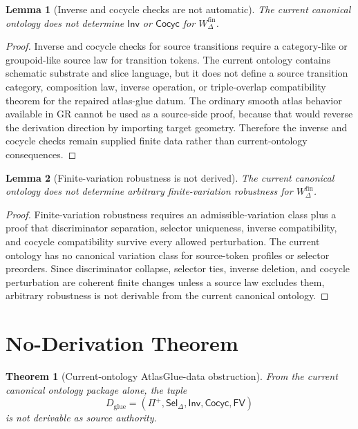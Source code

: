 \documentclass[11pt]{article}
\newcommand{\Prof}{\Pi^{+}}
\newcommand{\Sel}{\mathsf{Sel}_{\Delta}}
\newcommand{\Wfin}{W_{\Delta}^{\mathrm{fin}}}
\newtheorem{lemma}{Lemma}
\newtheorem{theorem}{Theorem}
\begin{document}
\begin{lemma}[Inverse and cocycle checks are not automatic]
The current canonical ontology does not determine \(\mathsf{Inv}\) or
\(\mathsf{Cocyc}\) for \(\Wfin\).
\end{lemma}

\begin{proof}
Inverse and cocycle checks for source transitions require a category-like or
groupoid-like source law for transition tokens. The current ontology contains
schematic substrate and slice language, but it does not define a source
transition category, composition law, inverse operation, or triple-overlap
compatibility theorem for the repaired atlas-glue datum. The ordinary smooth
atlas behavior available in GR cannot be used as a source-side proof, because
that would reverse the derivation direction by importing target geometry.
Therefore the inverse and cocycle checks remain supplied finite data rather
than current-ontology consequences.
\end{proof}

\begin{lemma}[Finite-variation robustness is not derived]
The current canonical ontology does not determine arbitrary finite-variation
robustness for \(\Wfin\).
\end{lemma}

\begin{proof}
Finite-variation robustness requires an admissible-variation class plus a
proof that discriminator separation, selector uniqueness, inverse
compatibility, and cocycle compatibility survive every allowed perturbation.
The current ontology has no canonical variation class for source-token
profiles or selector preorders. Since discriminator collapse, selector ties,
inverse deletion, and cocycle perturbation are coherent finite changes unless
a source law excludes them, arbitrary robustness is not derivable from the
current canonical ontology.
\end{proof}

\section{No-Derivation Theorem}

\begin{theorem}[Current-ontology AtlasGlue-data obstruction]
From the current canonical ontology package alone, the tuple
\[
  D_{\mathrm{glue}}
  =
  (\Prof,\Sel,\mathsf{Inv},\mathsf{Cocyc},\mathsf{FV})
\]
is not derivable as source authority.
\end{theorem}
\end{document}
